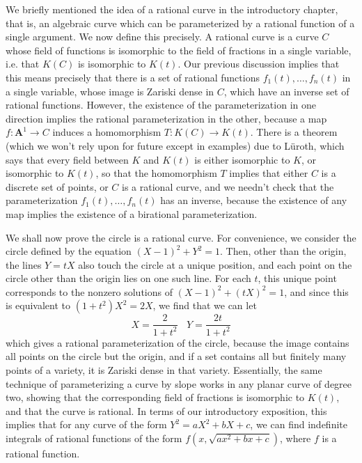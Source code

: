 We briefly mentioned the idea of a rational curve in the introductory chapter, that is, an algebraic curve which can be parameterized by a rational function of a single argument. We now define this precisely. A rational curve is a curve $C$ whose field of functions is isomorphic to the field of fractions in a single variable, i.e. that $K(C)$ is isomorphic to $K(t)$. Our previous discussion implies that this means precisely that there is a set of rational functions $f_1(t), \dots, f_n(t)$ in a single variable, whose image is Zariski dense in $C$, which have an inverse set of rational functions. However, the existence of the parameterization in one direction implies the rational parameterization in the other, because a map $f: \mathbf{A}^1 \to C$ induces a homomorphism $T: K(C) \to K(t)$. There is a theorem (which we won't rely upon for future except in examples) due to L\"{u}roth, which says that every field between $K$ and $K(t)$ is either isomorphic to $K$, or isomorphic to $K(t)$, so that the homomorphism $T$ implies that either $C$ is a discrete set of points, or $C$ is a rational curve, and we needn't check that the parameterization $f_1(t), \dots, f_n(t)$ has an inverse, because the existence of any map implies the existence of a birational parameterization.

\begin{example}
    We shall now prove the circle is a rational curve. For convenience, we consider the circle defined by the equation $(X-1)^2 + Y^2 = 1$. Then, other than the origin, the lines $Y = tX$ also touch the circle at a unique position, and each point on the circle other than the origin lies on one such line. For each $t$, this unique point corresponds to the nonzero solutions of $(X-1)^2 + (tX)^2 = 1$, and since this is equivalent to $(1+t^2)X^2 = 2X$, we find that we can let
    \[ X = \frac{2}{1 + t^2}\ \ \ \ Y = \frac{2t}{1+t^2} \]
    which gives a rational parameterization of the circle, because the image contains all points on the circle but the origin, and if a set contains all but finitely many points of a variety, it is Zariski dense in that variety. Essentially, the same technique of parameterizing a curve by slope works in any planar curve of degree two, showing that the corresponding field of fractions is isomorphic to $K(t)$, and that the curve is rational. In terms of our introductory exposition, this implies that for any curve of the form $Y^2 = aX^2 + bX + c$, we can find indefinite integrals of rational functions of the form $f(x,\sqrt{ax^2 + bx + c})$, where $f$ is a rational function.
\end{example}

